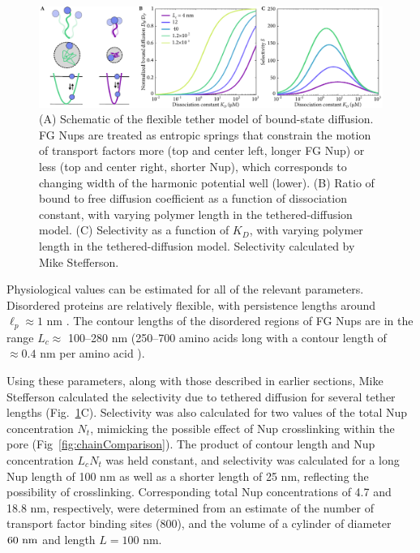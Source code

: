 \begin{figure}
\centering
\includegraphics[width=\textwidth]{figs/ch02/fig3.pdf}
\caption[Selectivity from tethered diffusion.]{(A) Schematic of the flexible tether model of bound-state
  diffusion. FG Nups are treated as entropic springs that constrain
  the motion of transport factors more (top and center left, longer FG Nup) or less
  (top and center right, shorter Nup), which corresponds to changing
  width of the harmonic potential well (lower).  (B) Ratio of bound to
  free diffusion coefficient as a function of dissociation constant,
  with varying polymer length in the tethered-diffusion model.  (C)
  Selectivity as a function of $K_D$, with varying polymer length in
  the tethered-diffusion model.  Selectivity calculated by Mike Stefferson.}
\label{fig:tethers}
\end{figure}

Physiological values can be estimated for all of the relevant parameters.  Disordered proteins are relatively flexible, with persistence lengths around $\ell_p \approx 1$ nm \cite{receveur-brechot12}.  The contour lengths of the disordered regions of FG Nups are in the range $L_c\approx$ 100--280 nm (250--700 amino acids long \cite{patel07} with a contour length of $\approx 0.4$ nm per amino acid ).

Using these parameters, along with those described in earlier sections, Mike Stefferson calculated the selectivity due to tethered diffusion for several tether lengths (Fig.~\ref{fig:tethers}C).  Selectivity was also calculated for two values of the total Nup concentration $N_t$, mimicking the possible effect of Nup crosslinking within the pore (Fig~\ref{fig:chainComparison}).  The product of contour length and Nup concentration $L_cN_t$ was held constant, and selectivity was calculated for a long Nup length of 100 nm as well as a shorter length of 25 nm, reflecting the possibility of crosslinking.  Corresponding total Nup concentrations of 4.7 and 18.8 nm, respectively, were determined from an estimate of the number of transport factor binding sites ($800$), and the volume of a cylinder of diameter $60\ \nm$ and length $L = 100$ nm. 

